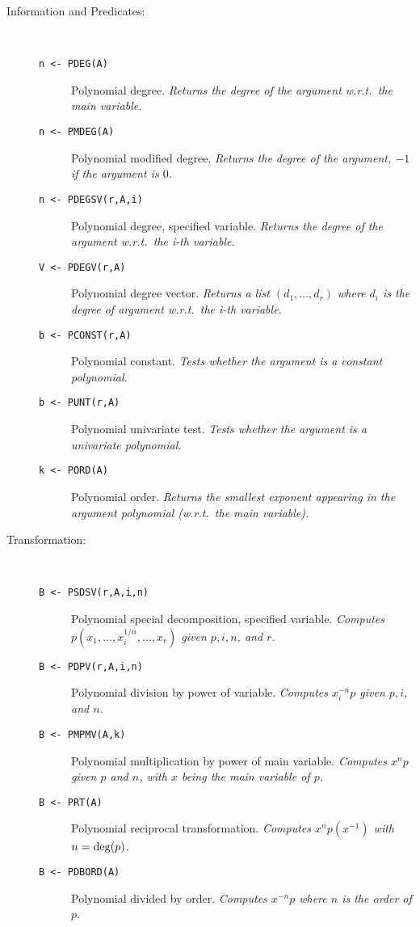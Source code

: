 \begin{description}
\item[Information and Predicates:] \ \
  \begin{description}
  \item[{\tt n <- PDEG(A) 
}]  Polynomial degree. {\em Returns the degree of the argument
    w.r.t.\ the main variable.}
  \item[{\tt n <- PMDEG(A) 
}]  Polynomial modified degree. {\em Returns the degree of the
    argument, $-1$ if the argument is $0$.}
  \item[{\tt n <- PDEGSV(r,A,i) 
}]  Polynomial degree, specified variable. {\em Returns the
    degree of the argument w.r.t.\ the i-th variable.}
  \item[{\tt V <- PDEGV(r,A) 
}]  Polynomial degree vector. {\em Returns a list
    $(d_1,\ldots,d_r)$ where $d_i$ is the degree of argument w.r.t.\ the
    i-th variable.}
  \item[{\tt b <- PCONST(r,A) 
}]  Polynomial constant. {\em Tests whether the argument is a
    constant polynomial.}
  \item[{\tt b <- PUNT(r,A) 
}]  Polynomial univariate test. {\em Tests whether the argument is a
    univariate polynomial.}
  \item[{\tt k <- PORD(A) 
}]  Polynomial order. {\em Returns the smallest exponent
    appearing in the argument polynomial (w.r.t.\ the main variable).}
  \end{description}

\item[Transformation:] \ \
  \begin{description}
  \item[{\tt B <- PSDSV(r,A,i,n) 
}]  Polynomial special decomposition, specified variable. {\em
    Computes $p(x_1, \ldots, x_i^{1/n}, \ldots, x_r)$ given $p, i, n$, and
    $r$.}
  \item[{\tt B <- PDPV(r,A,i,n) 
}]  Polynomial division by power of variable. {\em Computes
    $x_i^{-n} p$ given $p, i$, and $n$.}
  \item[{\tt B <- PMPMV(A,k) 
}]\index{PMPMV}  Polynomial multiplication by power of main variable. {\em
    Computes $x^n p$ given $p$ and $n$, with $x$ being the main variable of
    $p$.}
  \item[{\tt B <- PRT(A) 
}]  Polynomial reciprocal transformation. {\em Computes $x^n
    p(x^{-1})$ with $n = {\rm deg}(p)$.}
  \item[{\tt B <- PDBORD(A) 
}]\index{PDBORD}  Polynomial divided by order. {\em Computes $x^{-n} p$
    where $n$ is the order of $p$.}
  \end{description}


\end{description}
